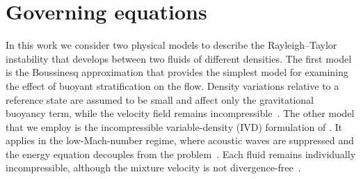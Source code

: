 \section{Governing equations}%
\label{sec:governing_equation}
In this work we consider two physical models to describe the Rayleigh--Taylor instability that develops between two fluids of different densities. The first model is the Boussinesq approximation that provides the simplest model for examining the effect of buoyant stratification on the flow. Density variations relative to a reference state are assumed to be small and affect only the gravitational buoyancy term, while the velocity field remains incompressible~\citep{boffetta-mazzino-2017}. The other model that we employ is the incompressible variable-density (IVD) formulation of \citet{sandoval-1995}. It applies in the low-Mach-number regime, where acoustic waves are suppressed and the energy equation decouples from the problem~\citep{livescu-ristorcelli-2007}. Each fluid remains individually incompressible, although the mixture velocity is not divergence-free~\citep{livescu-2013}.

